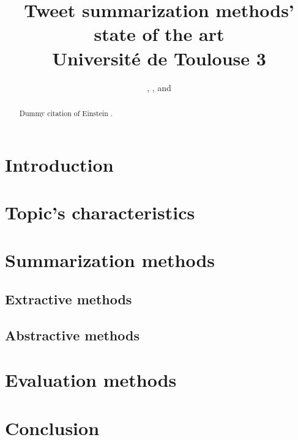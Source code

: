 \documentclass[a4paper, twocolumn]{article}
\begin{document}

\title{Tweet summarization methods' state of the art \\
    \large Université de Toulouse 3}
\author{
    ,
    ,
     and
    }
\date{}

\maketitle

\begin{abstract}

Dummy citation of Einstein \cite{einstein}.

\lipsum[1]

\end{abstract}

\section{Introduction}

\lipsum[2]
\lipsum[3]

\section{Topic's characteristics}

\lipsum[4]

\section{Summarization methods}

\lipsum[5]

\subsection{Extractive methods}

\lipsum[6]
\lipsum[7]

\subsection{Abstractive methods}

\lipsum[8]
\lipsum[9]

\section{Evaluation methods}

\lipsum[8]
\lipsum[9]

\section{Conclusion}

\lipsum[8]
\lipsum[9]



\end{document}
